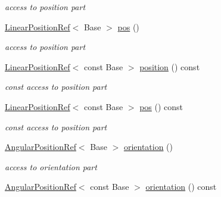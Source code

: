 \begin{DoxyCompactItemize}
\begin{DoxyCompactList}\small\item\em access to position part \end{DoxyCompactList}\item 
\hyperlink{classow__core_1_1LinearPositionRef}{Linear\+Position\+Ref}$<$ Base $>$ \hyperlink{classow__core_1_1CartesianPosition_af9bc0f69fc50b0aea1a85befa8719af5}{pos} ()\hypertarget{classow__core_1_1CartesianPosition_af9bc0f69fc50b0aea1a85befa8719af5}{}\label{classow__core_1_1CartesianPosition_af9bc0f69fc50b0aea1a85befa8719af5}

\begin{DoxyCompactList}\small\item\em access to position part \end{DoxyCompactList}\item 
\hyperlink{classow__core_1_1LinearPositionRef}{Linear\+Position\+Ref}$<$ const Base $>$ \hyperlink{classow__core_1_1CartesianPosition_adcb4a6deef06f26423e7a6ce5943d83e}{position} () const \hypertarget{classow__core_1_1CartesianPosition_adcb4a6deef06f26423e7a6ce5943d83e}{}\label{classow__core_1_1CartesianPosition_adcb4a6deef06f26423e7a6ce5943d83e}

\begin{DoxyCompactList}\small\item\em const access to position part \end{DoxyCompactList}\item 
\hyperlink{classow__core_1_1LinearPositionRef}{Linear\+Position\+Ref}$<$ const Base $>$ \hyperlink{classow__core_1_1CartesianPosition_a5af0ff138d70f210736231f2c48d7b7d}{pos} () const \hypertarget{classow__core_1_1CartesianPosition_a5af0ff138d70f210736231f2c48d7b7d}{}\label{classow__core_1_1CartesianPosition_a5af0ff138d70f210736231f2c48d7b7d}

\begin{DoxyCompactList}\small\item\em const access to position part \end{DoxyCompactList}\item 
\hyperlink{classow__core_1_1AngularPositionRef}{Angular\+Position\+Ref}$<$ Base $>$ \hyperlink{classow__core_1_1CartesianPosition_a1e7078e6698fcefe907e45d82df18fab}{orientation} ()\hypertarget{classow__core_1_1CartesianPosition_a1e7078e6698fcefe907e45d82df18fab}{}\label{classow__core_1_1CartesianPosition_a1e7078e6698fcefe907e45d82df18fab}

\begin{DoxyCompactList}\small\item\em access to orientation part \end{DoxyCompactList}\item 
\hyperlink{classow__core_1_1AngularPositionRef}{Angular\+Position\+Ref}$<$ const Base $>$ \hyperlink{classow__core_1_1CartesianPosition_aebff574a5f054528f777f1151e9f0798}{orientation} () const \hypertarget{classow__core_1_1CartesianPosition_aebff574a5f054528f777f1151e9f0798}{}\label{classow__core_1_1CartesianPosition_aebff574a5f054528f777f1151e9f0798}


\end{DoxyCompactItemize}

